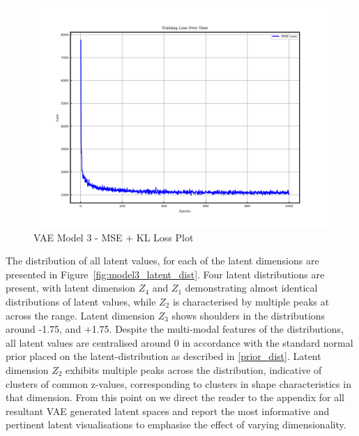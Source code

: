 \documentclass{article}
\begin{document}
\begin{figure}[H]
\centering
    \includegraphics[width=0.75\linewidth]{figures/VAEmodels/model3/loss_plot.png}
    \caption{VAE Model 3 - MSE + KL Loss Plot}
    \label{fig:model3_loss_plot}
\end{figure}

The distribution of all latent values, for each of the latent dimensions are presented in Figure~\ref{fig:model3_latent_dist}. Four latent distributions are present, with latent dimension $Z_4$ and $Z_1$ demonstrating almost identical distributions of latent values, while $Z_2$ is characterised by multiple peaks at across the range. Latent dimension $Z_3$ shows shoulders in the distributions around -1.75, and +1.75. Despite the multi-modal features of the distributions, all latent values are centralised around 0 in accordance with the standard normal prior placed on the latent-distribution as described in \ref{prior_dist}. Latent dimension $Z_2$ exhibits multiple peaks across the distribution, indicative of clusters of common z-values, corresponding to clusters in shape characteristics in that dimension. From this point on we direct the reader to the appendix for all resultant VAE generated latent spaces and report the most informative and pertinent latent visualisations to emphasise the effect of varying dimensionality. 
\end{document}
